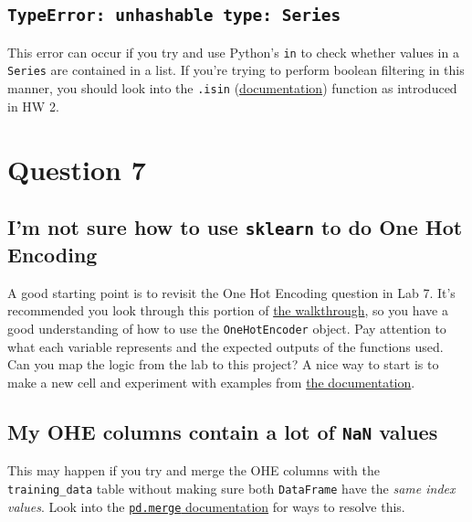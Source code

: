\documentclass[
  letterpaper,
  DIV=11,
  numbers=noendperiod]{scrreprt}
\begin{document}
\subsection{\texorpdfstring{\texttt{TypeError:\ unhashable\ type:\ \textquotesingle{}Series\textquotesingle{}}}{TypeError: unhashable type: \textquotesingle Series\textquotesingle{}}}\label{typeerror-unhashable-type-series}

This error can occur if you try and use Python's \texttt{in} to check
whether values in a \texttt{Series} are contained in a list. If you're
trying to perform boolean filtering in this manner, you should look into
the \texttt{.isin}
(\href{https://pandas.pydata.org/docs/reference/api/pandas.Series.isin.html}{documentation})
function as introduced in HW 2.

\section{Question 7}\label{question-7}

\subsection{\texorpdfstring{I'm not sure how to use \texttt{sklearn} to
do One Hot
Encoding}{I'm not sure how to use sklearn to do One Hot Encoding}}\label{im-not-sure-how-to-use-sklearn-to-do-one-hot-encoding}

A good starting point is to revisit the One Hot Encoding question in Lab
7. It's recommended you look through this portion of
\href{https://youtu.be/LohVOmiulHQ?feature=shared&t=442}{the
walkthrough}, so you have a good understanding of how to use the
\texttt{OneHotEncoder} object. Pay attention to what each variable
represents and the expected outputs of the functions used. Can you map
the logic from the lab to this project? A nice way to start is to make a
new cell and experiment with examples from
\href{https://scikit-learn.org/stable/modules/generated/sklearn.preprocessing.OneHotEncoder.html}{the
documentation}.

\subsection{\texorpdfstring{My OHE columns contain a lot of \texttt{NaN}
values}{My OHE columns contain a lot of NaN values}}\label{my-ohe-columns-contain-a-lot-of-nan-values}

This may happen if you try and merge the OHE columns with the
\texttt{training\_data} table without making sure both
\texttt{DataFrame} have the \emph{same index values}. Look into the
\href{https://pandas.pydata.org/pandas-docs/stable/reference/api/pandas.DataFrame.merge.html}{\texttt{pd.merge}
documentation} for ways to resolve this.
\end{document}

